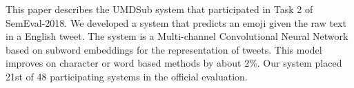 This paper describes the UMDSub system that participated in Task 2 of SemEval-2018. We developed a system that predicts an emoji given the raw text in a English tweet. The system is a Multi-channel Convolutional Neural Network based on subword embeddings for the representation of tweets. This model improves on character or word based methods by about 2\%. Our system placed 21st of 48 participating systems in the official evaluation.
